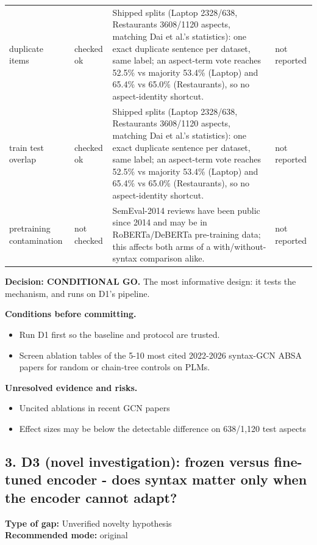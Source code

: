 \documentclass[11pt,a4paper]{article}
\begin{document}
{\begin{longtable}{>{\raggedright\arraybackslash}p{}>{\raggedright\arraybackslash}p{}>{\raggedright\arraybackslash}p{}>{\raggedright\arraybackslash}p{}}
duplicate items & checked ok & [V] Shipped splits (Laptop 2328/638, Restaurants 3608/1120 aspects, matching Dai et al.'s statistics): one exact duplicate sentence per dataset, same label; an aspect-term vote reaches 52.5\% vs majority 53.4\% (Laptop) and 65.4\% vs 65.0\% (Restaurants), so no aspect-identity shortcut. \cite{dai2021syntax} & not reported \\
train test overlap & checked ok & [V] Shipped splits (Laptop 2328/638, Restaurants 3608/1120 aspects, matching Dai et al.'s statistics): one exact duplicate sentence per dataset, same label; an aspect-term vote reaches 52.5\% vs majority 53.4\% (Laptop) and 65.4\% vs 65.0\% (Restaurants), so no aspect-identity shortcut. \cite{dai2021syntax} & not reported \\
pretraining contamination & not checked & SemEval-2014 reviews have been public since 2014 and may be in RoBERTa/DeBERTa pre-training data; this affects both arms of a with/without-syntax comparison alike. & not reported \\
\bottomrule
\end{longtable}
}

\textbf{Decision: CONDITIONAL GO.} The most informative design: it tests the mechanism, and runs on D1's pipeline.

\textbf{Conditions before committing.}
\begin{itemize}
\item Run D1 first so the baseline and protocol are trusted.
\item Screen ablation tables of the 5-10 most cited 2022-2026 syntax-GCN ABSA papers for random or chain-tree controls on PLMs.
\end{itemize}

\textbf{Unresolved evidence and risks.}
\begin{itemize}
\item Uncited ablations in recent GCN papers
\item Effect sizes may be below the detectable difference on 638/1,120 test aspects
\end{itemize}

\subsection{3. D3 (novel investigation): frozen versus fine-tuned encoder - does syntax matter only when the encoder cannot adapt?}
\textbf{Type of gap:} Unverified novelty hypothesis\\
\textbf{Recommended mode:} original
\end{document}
